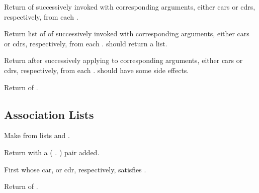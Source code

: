 \begin{LIST}{1cm}
  {
  Return  of  successively
  invoked with corresponding arguments, either cars or cdrs, respectively,
  from each . 
  }

  {
  Return list of 
   of
   successively invoked with corresponding arguments,
  either cars or cdrs, respectively,
  from each .  should return a list.
  }

  {
  Return  after successively applying
   to corresponding arguments, either cars or cdrs,
  respectively, from each .  should have some side
  effects. 
  }

  {
  Return  of .
  }

\end{LIST}


\subsection{Association Lists} 
\label{section:Association Lists}
\begin{LIST}{1cm}

  {
  Make  from lists  and .
  }

  {
  Return  with a ( . ) pair added.
  }

  {
%
  First  whose car, or cdr, respectively, satisfies .
  }

  {
  Return  of .
  }

\end{LIST}


